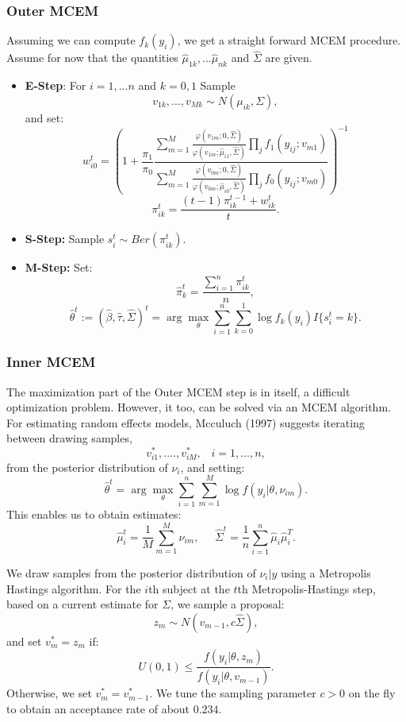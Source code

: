 \documentclass{article}\usepackage[]{graphicx}\usepackage[]{color}
\begin{document}
\subsubsection{Outer MCEM}\label{sub:outer}
Assuming we can compute $f_k(y_i)$, we get a straight forward MCEM procedure. Assume for now that the quantities $\hat\mu_{1k},...\hat\mu_{nk}$ and $\hat\Sigma$ are given.  
\begin{itemize}
\item \textbf{E-Step}: For $i=1,...n$ and $k=0,1$ Sample
$$
v_{1k},...,v_{Mk} \sim N(\mu_{ik}, \Sigma),
$$
and set:
$$
w_{i0}^{t} = 
 \left(1 + \frac{\pi_1}{\pi_0}
\frac{\sum_{m=1}^{M} \frac{\varphi(v_{1m};0,\hat\Sigma)}{\varphi(v_{1m}; \hat\mu_{i1}, \hat\Sigma)}\prod_{j} f_1(y_{ij} ; v_{m1})}
{\sum_{m=1}^{M}\frac{\varphi(v_{0m};0,\hat\Sigma)}{\varphi(v_{0m}; \hat\mu_{i0}, \hat\Sigma)} \prod_{j} f_0(y_{ij} ; v_{m0})} 
\right)^{-1} 
$$$$
\pi_{ik}^t = \frac{(t - 1)\pi_{ik}^{t-1} + w_{ik}^{t}}{t}.
$$

\item \textbf{S-Step:} Sample $s_{i}^t \sim Ber(\pi_{ik}^t)$.

\item \textbf{M-Step:} Set:
$$
\hat\pi^t_k = \frac{\sum_{i=1}^{n} \pi_{ik}^t}{n},
$$$$
\hat\theta^t := (\hat \beta, \hat\tau,\hat\Sigma)^t =\arg\max_{\theta} \sum_{i=1}^{n} \sum_{k=0}^{1} \log f_k(y_i) I\{s_{i}^{t} = k\}.
$$
\end{itemize}



\subsubsection{Inner MCEM}\label{sub:inner}
The maximization part of the Outer MCEM step is in itself, a difficult optimization problem. However, it too, can be solved via an MCEM algorithm. For estimating random effects models, Mcculuch (1997) suggests iterating between drawing samples,
$$
v_{i1}^*,....,v^*_{iM}, \;\;\; i = 1,...,n,
$$
from the posterior distribution of $\nu_i$, and setting:
$$
\hat\theta^t = \arg\max_{\theta} \sum_{i=1}^{n}\sum_{m=1}^{M} \log f(y_i | \theta, \nu_{im}).
$$
This enables us to obtain estimates:
$$
\hat{\mu}_i^t = \frac{1}{M} \sum_{m=1}^{M} \nu_{im}, \;\;\;\;\;
\hat\Sigma^t = \frac{1}{n} \sum_{i=1}^{n} \hat{\mu}_i\hat\mu_i^T.
$$

We draw samples from the posterior distribution of $\nu_i | y$ using a Metropolis Hastings algorithm. For the $i$th subject at the $t$th Metropolis-Hastings step, based on a current estimate for $\Sigma$, we sample a proposal:
$$
z_m \sim N(v_{m-1}, c\hat\Sigma),
$$
and set $v_m^* = z_m$ if:
$$
U(0,1) \leq \frac{f(y_i|\theta, z_m)}{f(y_i|\theta, v_{m-1})}.
$$
Otherwise, we set $v_m^* = v^*_{m-1}$. We tune the sampling parameter $c>0$ on the fly to obtain an acceptance rate of about $0.234$.
\end{document}
